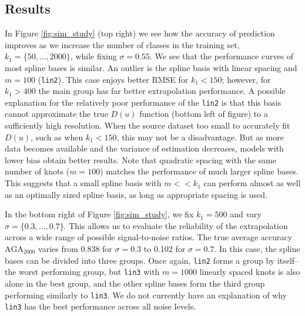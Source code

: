 \documentclass[twoside,11pt]{article}
\begin{document}
\subsection*{Results}
In Figure \ref{fig:sim_study} (top right) we see how the accuracy of prediction
improves as we increase the number of classes in the training set, $k_1=\{50,\hdots,2000\}$, while fixing $\sigma = 0.55$.
We see that the performance curves of most spline bases is similar. An outlier is the spline basis with linear spacing and $m=100$ ({\tt lin2}). This case enjoys better RMSE for $k_1 < 150$; however, for $k_1 > 400$ the main group has far better extrapolation performance.
A possible explanation for the relatively poor performance of the {\tt lin2} is that this basis cannot approximate the true $D(u)$ function (bottom left of figure) to a sufficiently high resolution.
When the source dataset too small to accurately fit $D(u)$, such as when $k_1 < 150$, this may not be a disadvantage. But as more data becomes available and the variance of estimation
decreases, models with lower bias obtain better results.
Note that quadratic spacing with the same number of knots ($m=100$) matches the performance of much larger spline bases.  This suggests that a small spline basis with $m << k_1$ can perform almost as well as an optimally sized spline basis, as long as appropriate spacing is used.
 
In the bottom right of Figure \ref{fig:sim_study}, we fix $k_1=500$ and vary $\sigma=\{0.3,\hdots,0.7\}$. This allows us to evaluate the reliability of the extrapolation across a wide range of possible signal-to-noise ratios.
The true average accuracy $\text{AGA}_{2000}$ varies from 0.838 for $\sigma = 0.3$ to 0.102 for $\sigma = 0.7$.
In this case, the spline bases can be divided into three groups.
Once again, {\tt lin2} forms a group by itself--the worst performing group, but {\tt lin3} with $m = 1000$ linearly spaced knots is also alone in the best group, and the other spline bases form the third group performing similarly to {\tt lin3}.
We do not currently have an explanation of why {\tt lin3} has the best performance across all noise levels.
\end{document}
